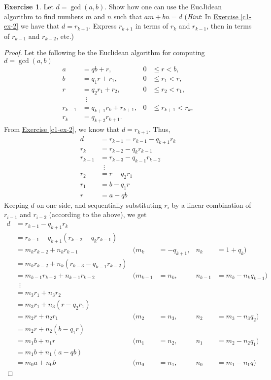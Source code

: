\documentclass{article}
\theoremstyle{definition}
\newtheorem{exercise}{Exercise}
\begin{document}
\begin{exercise} \label{c1-ex-4}
Let $d = \gcd(a, b)$. Show how one can use the EucJidean algorithm to find numbers $m$ and $n$ such that $am + bn = d$ (\textit{Hint}: In \hyperref[c1-ex-2]{Exercise \ref*{c1-ex-2}} we have that $d = r_{k + 1}$. Express $r_{k + 1}$ in terms of $r_k$ and $r_{k - 1}$, then in terms of $r_{k - 1}$ and $r_{k - 2}$, etc.)
\end{exercise}
\begin{proof}
Let the following be the Euclidean algorithm for computing $d = \gcd(a, b)$
\begin{align*}
a & = qb + r, & 0 & \leq r < b, \\
b & = q_1 r + r_1, & 0 & \leq r_1 < r, \\
r & = q_2 r_1 + r_2, & 0 & \leq r_2 < r_1, \\
& \enspace\vdots & & \\
r_{k - 1} & = q_{k + 1} r_k + r_{k + 1}, & 0 & \leq r_{k + 1} < r_k, \\
r_k & = q_{k + 2} r_{k + 1}. & & 
\end{align*}
From \hyperref[c1-ex-2]{Exercise \ref*{c1-ex-2}}, we know that $d = r_{k + 1}$. Thus,
\begin{align*}
d & = r_{k + 1} = r_{k - 1} - q_{k + 1} r_k \\
r_k & = r_{k - 2} - q_k r_{k - 1} \\
r_{k - 1} & = r_{k - 3} - q_{k - 1} r_{k - 2} \\
& \enspace\vdots \\
r_2 & = r - q_2 r_1 \\
r_1 & = b - q_1 r \\
r & = a - qb
\end{align*}
Keeping $d$ on one side, and sequentially substituting $r_i$ by a linear combination of $r_{i - 1}$ and $r_{i - 2}$ (according to the above), we get
\begin{align*}
d & = r_{k - 1} - q_{k + 1} r_k & & & & \\
& = r_{k - 1} - q_{k + 1} (r_{k - 2} - q_k r_{k - 1}) & & & & \\
& = m_k r_{k - 2} + n_k r_{k - 1} & (m_k & = -q_{k + 1}, & n_k & = 1 + q_k) \\
& = m_k r_{k - 2} + n_k (r_{k - 3} - q_{k - 1} r_{k - 2}) & & & & \\
& = m_{k - 1} r_{k - 3} + n_{k - 1} r_{k - 2} & (m_{k - 1} & = n_k, & n_{k - 1} & = m_k - n_k q_{k - 1}) \\
& \enspace\vdots & & & & \\
& = m_3 r_1 + n_3 r_2 & & & & \\
& = m_3 r_1 + n_3 (r - q_2 r_1) & & & & \\
& = m_2 r + n_2 r_1 & (m_2 & = n_3, & n_2 & = m_3 - n_3 q_2) \\
& = m_2 r + n_2 (b - q_1 r) & & & & \\
& = m_1 b + n_1 r & (m_1 & = n_2, & n_1 & = m_2 - n_2 q_1) \\
& = m_1 b + n_1 (a - qb) & & & & \\
& = m_0 a + n_0 b & (m_0 & = n_1, & n_0 & = m_1 - n_1 q)
\end{align*}
\end{proof}
\end{document}
